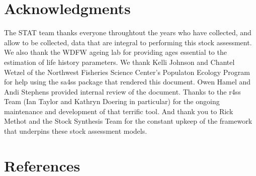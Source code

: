 \documentclass[11pt,
  english,
  a4paper,
]{article}
\begin{document}
\tagstructend


\hypertarget{acknowledgments}{%
\section{Acknowledgments}\label{acknowledgments}}

\leavevmode\tagmcend\tagstructend


The STAT team thanks everyone throughtout the years who have collected, and allow to be collected, data that are integral to performing this stock assessment. We also thank the WDFW ageing lab for providing ages essential to the estimation of life history parameters. We thank Kelli Johnson and Chantel Wetzel of the Northwest Fisheries Science Center's Populaton Ecology Program for help using the sa4ss package that rendered this document. Owen Hamel and Andi Stephens provided internal review of the document. Thanks to the r4ss Team (Ian Taylor and Kathryn Doering in particular) for the ongoing maintenance and development of that terrific tool. And thank you to Rick Methot and the Stock Synthesis Team for the constant upkeep of the framework that underpins these stock assessment models.

\leavevmode\tagmcend\tagstructend\par

\clearpage


\hypertarget{references}{%
\section{References}\label{references}}

\leavevmode\tagmcend\tagstructend

\end{document}
